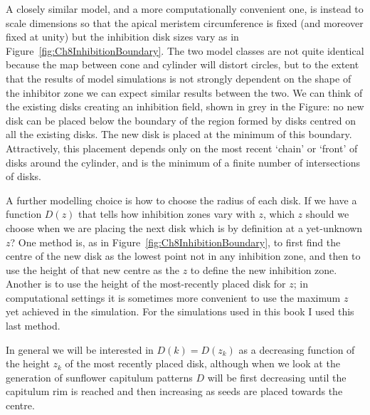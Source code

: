 A closely similar model, and a more computationally convenient one, is instead to scale dimensions so that the apical meristem circumference is fixed (and moreover fixed at unity) but the inhibition disk sizes vary as in Figure~\ref{fig:Ch8InhibitionBoundary}. The two model classes are not quite identical because the map between cone and cylinder will distort circles, but to the extent that the results of model simulations is not strongly dependent on the shape of the inhibitor zone we can expect similar results between the two.
 We can 
think of the existing disks creating an inhibition field, shown in grey in the Figure: no new disk can be placed below the boundary of the region formed by disks centred on all the existing disks. The new disk is placed at the minimum of this boundary.  Attractively, this placement depends only on the most recent `chain' or `front' of disks around the cylinder, and is the minimum of a finite number of intersections of disks. 

\clearpage
{}

A further modelling choice is how to choose the radius of each disk. If we have a function $D(z)$ that tells how inhibition zones vary with $z$, which $z$ should we choose when we are placing the next disk which is by definition at a yet-unknown $z$?  One method is, as in Figure~\ref{fig:Ch8InhibitionBoundary}, to first find the centre of the new disk as the lowest point not in any inhibition zone, and then to use the height of that new centre as the $z$ to define the new inhibition zone. Another is to use the height of the most-recently placed disk for $z$; in computational settings it is sometimes more convenient to use the maximum $z$ yet achieved in the simulation. For the simulations used in this book I used this last method.

In general we will be interested in $D(k)=D(z_k)$ as a decreasing function of the height $z_k$ of the most recently placed disk, although when we look at the generation of sunflower capitulum patterns $D$ will be first decreasing until the capitulum rim is reached and then increasing as seeds are placed towards the centre. 

